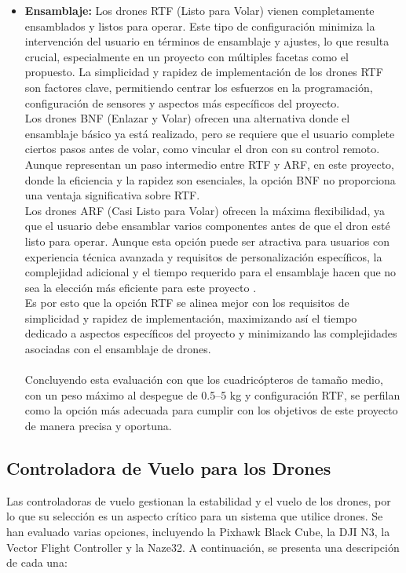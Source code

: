 \begin{itemize}
\item \textbf{Ensamblaje:}
Los drones RTF (Listo para Volar) vienen completamente ensamblados y listos para operar. Este tipo de configuración minimiza la intervención del usuario en términos de ensamblaje y ajustes, lo que resulta crucial, especialmente en un proyecto con múltiples facetas como el propuesto. La simplicidad y rapidez de implementación de los drones RTF son factores clave, permitiendo centrar los esfuerzos en la programación, configuración de sensores y aspectos más específicos del proyecto.\\
Los drones BNF (Enlazar y Volar) ofrecen una alternativa donde el ensamblaje básico ya está realizado, pero se requiere que el usuario complete ciertos pasos antes de volar, como vincular el dron con su control remoto. Aunque representan un paso intermedio entre RTF y ARF, en este proyecto, donde la eficiencia y la rapidez son esenciales, la opción BNF no proporciona una ventaja significativa sobre RTF.\\
Los drones ARF (Casi Listo para Volar) ofrecen la máxima flexibilidad, ya que el usuario debe ensamblar varios componentes antes de que el dron esté listo para operar. Aunque esta opción puede ser atractiva para usuarios con experiencia técnica avanzada y requisitos de personalización específicos, la complejidad adicional y el tiempo requerido para el ensamblaje hacen que no sea la elección más eficiente para este proyecto \cite{tiposdrones}.\\
Es por esto que la opción RTF se alinea mejor con los requisitos de simplicidad y rapidez de implementación, maximizando así el tiempo dedicado a aspectos específicos del proyecto y minimizando las complejidades asociadas con el ensamblaje de drones.
\\\\
Concluyendo esta evaluación con que los cuadricópteros de tamaño medio, con un peso máximo al despegue de 0.5–5 kg y configuración RTF, se perfilan como la opción más adecuada para cumplir con los objetivos de este proyecto de manera precisa y oportuna.

\end{itemize}

\subsection{Controladora de Vuelo para los Drones}
Las controladoras de vuelo gestionan la estabilidad y el vuelo de los drones, por lo que su selección es un aspecto crítico para un sistema que utilice drones. Se han evaluado varias opciones, incluyendo la Pixhawk Black Cube, la DJI N3, la Vector Flight Controller y la Naze32. A continuación, se presenta una descripción de cada una:

